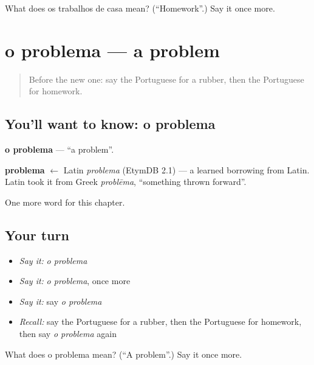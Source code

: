 \begin{tcolorbox}[breakable,colback=teal!4,colframe=teal!35!black,title={Before you move on}]
What does os trabalhos de casa mean? (\textquotedblleft{}Homework\textquotedblright{}.) Say it once more.
\end{tcolorbox}
\section[o problema]{o problema — a problem}

\label{lesson:PT-C113-problema}



\begin{quote}
Before the new one: say the Portuguese for a rubber, then the Portuguese for homework.
\end{quote}

\subsection*{You'll want to know: o problema}
\textbf{o problema} — \textquotedblleft{}a problem\textquotedblright{}.

\begin{cousinweb}
\textbf{problema} $\leftarrow$ Latin \emph{problema} (EtymDB 2.1) — a learned borrowing from Latin. Latin took it from Greek \emph{problēma}, \textquotedblleft{}something thrown forward\textquotedblright{}.
\end{cousinweb}

\begin{grammarlens}[title={What you've built}]
One more word for this chapter.
\end{grammarlens}

\subsection*{Your turn}
\begin{itemize}
\raggedright
  \item \emph{Say it:} \emph{o problema}
  \item \emph{Say it:} \emph{o problema}, once more
  \item \emph{Say it:} say \emph{o problema}
  \item \emph{Recall:} say the Portuguese for a rubber, then the Portuguese for homework, then say \emph{o problema} again
\end{itemize}

\begin{tcolorbox}[breakable,colback=teal!4,colframe=teal!35!black,title={Before you move on}]
What does o problema mean? (\textquotedblleft{}A problem\textquotedblright{}.) Say it once more.
\end{tcolorbox}
